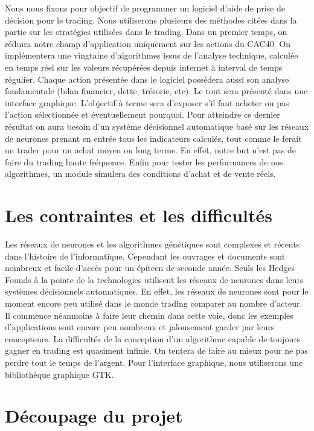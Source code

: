 \documentclass[a4paper,12pt]{article}
\begin{document}
Nous nous fixons pour objectif de programmer un logiciel d'aide de prise de décision pour le trading. Nous utiliserons plusieurs des méthodes citées dans la partie sur les stratégies utilisées dans le trading. Dans un premier temps, on réduira notre champ d'application uniquement sur les actions du CAC40. On implémentera une vingtaine d'algorithmes issus de l'analyse technique, calculée en temps réel sur les valeurs récupérées depuis internet à interval de temps régulier. Chaque action présentée dans le logiciel possédera aussi son analyse fondamentale (bilan financier, dette, trésorie, etc). Le tout sera présenté dans une interface graphique. L'objectif à terme sera d'exposer s'il faut acheter ou pas l'action sélectionnée et éventuellement pourquoi. Pour atteindre ce dernier résultat on aura besoin d'un système décisionnel automatique basé sur les réseaux de neurones prenant en entrée tous les indicateurs calculés, tout comme le ferait un trader pour un achat moyen ou long terme. En effet, notre but n'est pas de faire du trading haute fréquence. Enfin pour tester les performances de nos algorithmes, un module simulera des conditions d'achat et de vente réels. 

\section{Les contraintes et les difficultés}

Les réseaux de neurones et les algorithmes génétiques sont complexes et récents dans l'histoire de l'informatique. Cependant les ouvrages et documents sont nombreux et facile d'accès pour un épiteen de seconde année. Seuls les Hedges Founds à la pointe de la technologies utilisent les réseaux de neurones dans leurs systèmes décisionnels automatiques. En effet, les réseaux de neurones sont pour le moment encore peu utilisé dans le monde trading comparer au nombre d'acteur. Il commence néanmoins à faire leur chemin dans cette voie, donc les exemples d'applications sont encore peu nombreux et jalousement garder par leurs concepteurs. La difficultés de la conception d'un algorithme capable de toujours gagner en trading est quasiment infinie. On tentera de faire au mieux pour ne pas perdre tout le temps de l'argent. Pour l'interface graphique, nous utiliserons une bibliothèque graphique GTK.

\newpage

\section{Découpage du projet}
\end{document}
